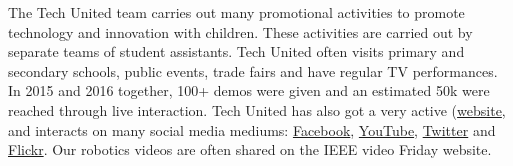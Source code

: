 The Tech United team carries out many promotional activities to promote technology and innovation with children. These activities are carried out by separate teams of student assistants. Tech United often visits primary and secondary schools, public events, trade fairs and have regular TV performances. In 2015 and 2016 together, 100+ demos were given and an estimated 50k were reached through live interaction.
Tech United has also got a very active (\href{www.techunited.nl}{website}, and interacts on many social media mediums: \href{https://www.facebook.com/techunited}{Facebook}, \href{https://www.youtube.com/user/TechUnited}{YouTube}, \href{https://twitter.com/TechUnited}{Twitter} and \href{https://www.flickr.com/photos/techunited/}{Flickr}. Our robotics videos are often shared on the IEEE video Friday website.
